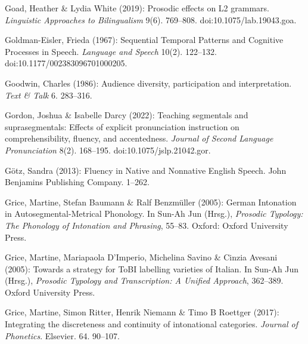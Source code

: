 \begin{styleBibliography}
Goad, Heather \& Lydia White (2019): Prosodic effects on L2 grammars. \textit{Linguistic Approaches to Bilingualism} 9(6). 769–808. doi:10.1075/lab.19043.goa.
\end{styleBibliography}

\begin{styleBibliography}
Goldman-Eisler, Frieda (1967): Sequential Temporal Patterns and Cognitive Processes in Speech. \textit{Language and Speech} 10(2). 122–132. doi:10.1177/002383096701000205.
\end{styleBibliography}

\begin{styleBibliography}
Goodwin, Charles (1986): Audience diversity, participation and interpretation. \textit{Text \& Talk} 6. 283–316.
\end{styleBibliography}

\begin{styleBibliography}
Gordon, Joshua \& Isabelle Darcy (2022): Teaching segmentals and suprasegmentals: Effects of explicit pronunciation instruction on comprehensibility, fluency, and accentedness. \textit{Journal of Second Language Pronunciation} 8(2). 168–195. doi:10.1075/jslp.21042.gor.
\end{styleBibliography}

\begin{styleBibliography}
Götz, Sandra (2013): Fluency in Native and Nonnative English Speech. John Benjamins Publishing Company. 1–262.
\end{styleBibliography}

\begin{styleBibliography}
Grice, Martine, Stefan Baumann \& Ralf Benzmüller (2005): German Intonation in Autosegmental-Metrical Phonology. In Sun-Ah Jun (Hrsg.), \textit{Prosodic Typology: The Phonology of Intonation and Phrasing}, 55–83. Oxford: Oxford University Press.
\end{styleBibliography}

\begin{styleBibliography}
Grice, Martine, Mariapaola D’Imperio, Michelina Savino \& Cinzia Avesani (2005): Towards a strategy for ToBI labelling varieties of Italian. In Sun-Ah Jun (Hrsg.), \textit{Prosodic Typology and Transcription: A Unified Approach}, 362–389. Oxford University Press.
\end{styleBibliography}

\begin{styleBibliography}
Grice, Martine, Simon Ritter, Henrik Niemann \& Timo B Roettger (2017): Integrating the discreteness and continuity of intonational categories. \textit{Journal of Phonetics}. Elsevier. 64. 90–107.
\end{styleBibliography}

